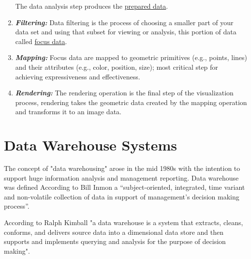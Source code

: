 \begin{enumerate}
\begin{itemize}
  \end{itemize}
  The data analysis step produces the \underline{prepared data}.
  \item \textbf{\textit{Filtering:}} Data filtering is the process of choosing a smaller part of your data set and using that subset for viewing or analysis\cite{WhatDataFiltering}, this portion of data called \underline{focus data}. 
  \item \textbf{\textit{Mapping:}} Focus data are mapped to geometric primitives (e.g., points, lines) and their attributes (e.g., color, position, size); most critical step for achieving expressiveness and effectiveness.
  \item \textbf{\textit{Rendering:}} The rendering operation is the final step of the visualization process, rendering takes the geometric data created by the mapping operation and transforms it to an image data.
  \end{enumerate}
  



\section{Data Warehouse Systems}
\label{sec:dataWarehouse}
The concept of "data warehousing" arose in the mid 1980s with the intention to support huge information analysis and management reporting\cite{wahDevelopmentDataWarehouse2009}. Data warehouse was defined According to Bill Inmon a “subject-oriented, integrated, time variant and non-volatile collection of data in support of management’s decision making process”\cite{inmonBuildingDataWarehouse2005}.
 
 
According to Ralph Kimball "a data warehouse is a system that extracts, cleans, conforms, and delivers source data into a dimensional data store and then supports and implements querying and analysis for the purpose of decision making"\cite{kimballDataWarehouseETLToolkit2011}.


